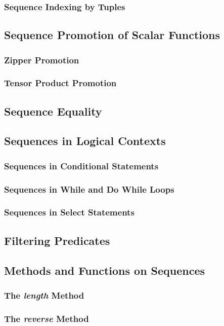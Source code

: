 \documentclass[10pt,twoside,titlepage]{article}
\begin{document}
\subsubsection{Sequence Indexing by Tuples}
\subsection{Sequence Promotion of Scalar Functions}
\subsubsection{Zipper Promotion}
\subsubsection{Tensor Product Promotion}
\subsection{Sequence Equality}
\subsection{Sequences in Logical Contexts}
\subsubsection{Sequences in Conditional Statements}
\subsubsection{Sequences in While and Do While Loops}
\subsubsection{Sequences in Select Statements}
\subsection{Filtering Predicates}
\subsection{Methods and Functions on Sequences}
\subsubsection{The {\em length} Method}
\subsubsection{The {\em reverse} Method}
\end{document}
